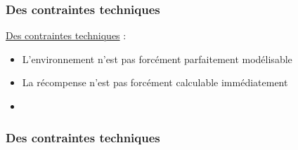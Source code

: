 \begin{frame}
  \frametitle{Des contraintes techniques}
  \underline{Des contraintes techniques} :
  \begin{itemize}
  \item L'environnement n'est pas forcément parfaitement modélisable
  \item La récompense n'est pas forcément calculable immédiatement
  \item {}
  \end{itemize}
\end{frame}

\begin{frame}
  \frametitle{Des contraintes techniques}
\end{frame}

